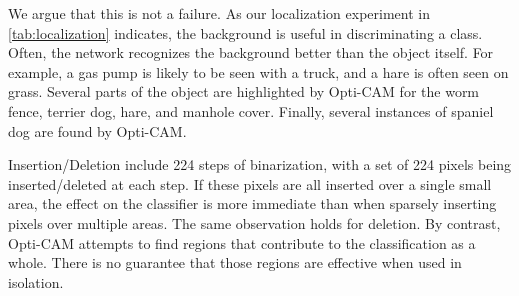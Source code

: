 

We argue that this is not a failure. As our localization experiment in \autoref{tab:localization} 
indicates, the background is useful in discriminating a class. Often, the network recognizes the 
background better than the object itself. For example, a gas pump is likely to be seen with a truck, 
and a hare is often seen on grass. Several parts of the object are highlighted by Opti-CAM for the 
worm fence, terrier dog, hare, and manhole cover. Finally, several instances of spaniel dog are found 
by Opti-CAM.

Insertion/Deletion include 224 steps of binarization, with a set of 224 pixels being 
inserted/deleted at each step. If these pixels are all inserted over a single small area, the 
effect on the classifier is more immediate than when sparsely inserting pixels over multiple areas. 
The same observation holds for deletion. By contrast, Opti-CAM attempts to find regions that 
contribute to the classification as a whole. There is no guarantee that those regions are effective 
when used in isolation.

